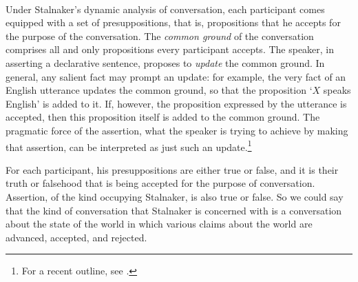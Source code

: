 
\def\H{\ensuremath{H}}
\def\Sp{\ensuremath{S}}
\thispagestyle{empty}
\noindent{}%

\paragraph{}


Under Stalnaker's dynamic analysis of conversation, each participant comes equipped with a set of presuppositions, that is, propositions that he accepts for the purpose of the conversation. The \emph{common ground} of the conversation comprises all and only propositions every participant accepts. The speaker, in asserting a declarative sentence, proposes to \emph{update} the common ground. In general, any salient fact may prompt an update: for example, the very fact of an English utterance updates the common ground, so that the proposition `$X$ speaks English' is added to it. If, however, the proposition expressed by the utterance is accepted, then this proposition itself is added to the common ground. The pragmatic force of the assertion, what the speaker is trying to achieve by making that assertion, can be interpreted as just such an update.\footnote{For a recent outline, see \citet[24--25, 46--53]{Sta14}.}

For each participant, his presuppositions are either true or false, and it is their truth or falsehood that is being accepted for the purpose of conversation. Assertion, of the kind occupying Stalnaker, is also true or false. So we could say that the kind of conversation that Stalnaker is concerned with is a conversation about the state of the world in which various claims about the world are advanced, accepted, and rejected.

